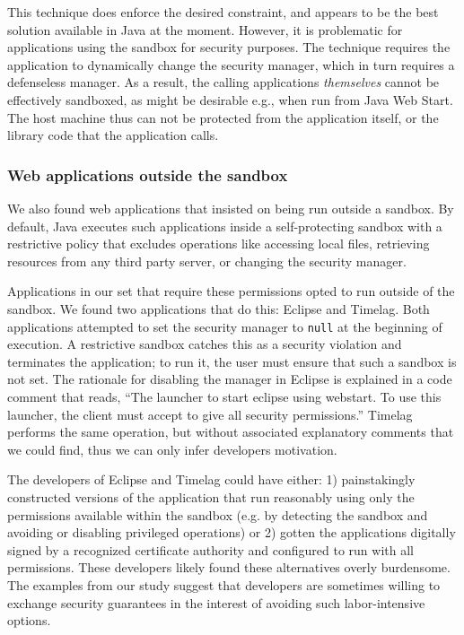 \documentclass{sig-alternate-05-2015}
\begin{document}
This technique does enforce the
desired constraint, and appears to be the best solution available
in Java at the moment.  However, it is problematic for applications using the
sandbox for security purposes.  The technique requires 
the application to dynamically change the security manager, which in turn requires a
defenseless manager.  As a result, the calling applications \emph{themselves} cannot be
effectively sandboxed, as might be desirable e.g., when run from Java Web Start.
The host machine thus can not be protected from the application itself, or the
library code that the application calls. 

\subsubsection{Web applications outside the sandbox}\label{sub:Reducing-Web-Application-Complexity}

We also found web applications that insisted on being run outside a sandbox. By default,
Java executes such applications inside a self-protecting 
sandbox with a restrictive policy that excludes
operations like accessing local files, retrieving resources
from any third party server, or changing the security manager. 

Applications in our set that require these permissions
opted to run outside of the sandbox.  
We found two applications that do this: Eclipse and
Timelag.  Both applications attempted
to set the security manager to \texttt{null} at the beginning of execution.
A restrictive sandbox catches this as a security violation and terminates the
application; to run it, the user must ensure that such a sandbox is not set.
The rationale for disabling the manager in Eclipse is explained in a 
code comment that reads, ``The launcher to start eclipse using webstart. To use
this launcher, the client must accept to give all security permissions.'' Timelag
performs the same operation, but without associated explanatory comments that we
could find, thus we can only 
infer developers motivation. 

The developers of Eclipse and Timelag could have either: 1) painstakingly
constructed versions of the application that run reasonably using only the 
permissions available within the sandbox (e.g. by
detecting the sandbox and avoiding or disabling privileged operations) or 2) gotten
the applications digitally signed by a recognized certificate authority and
configured to run with all permissions. These developers likely found these 
alternatives overly burdensome. The examples from our study suggest that
developers are sometimes willing to exchange security guarantees in the interest
of avoiding such labor-intensive options.
\end{document}
